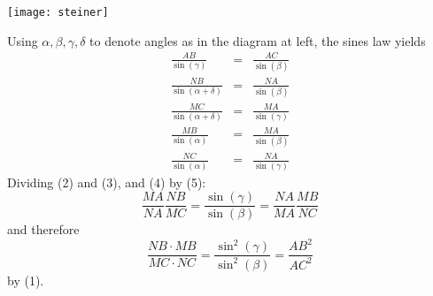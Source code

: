 \documentclass[12pt]{article}
\begin{document}
\texttt{[image: steiner]}

Using $\alpha,\beta,\gamma,\delta$ to denote angles as in the diagram
at left, the sines law yields
\begin{eqnarray}
\frac{AB}{\sin(\gamma)}&=&\frac{AC}{\sin(\beta)} \\
\frac{NB}{\sin(\alpha+\delta)}&=&\frac{NA}{\sin(\beta)} \\
\frac{MC}{\sin(\alpha+\delta)}&=&\frac{MA}{\sin(\gamma)} \\
\frac{MB}{\sin(\alpha)}&=&\frac{MA}{\sin(\beta)} \\
\frac{NC}{\sin(\alpha)}&=&\frac{NA}{\sin(\gamma)}
\end{eqnarray}
Dividing (2) and (3), and (4) by (5):
$$\frac{MA}{NA}\frac{NB}{MC}=\frac{\sin(\gamma)}{\sin(\beta)}=\frac{NA}{MA}\frac{MB}{NC}$$
and therefore
$$\frac{NB\cdot MB}{MC\cdot NC}=\frac{\sin^2(\gamma)}{\sin^2(\beta)}
=\frac{AB^2}{AC^2}
$$
by (1).
\end{document}
